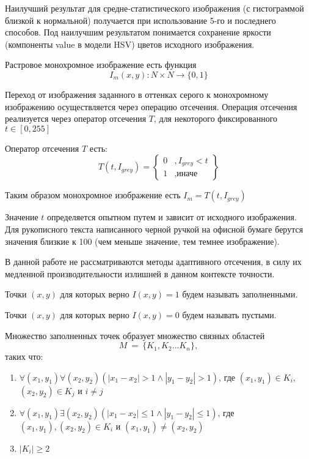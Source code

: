 \begin{remark}
Наилучший результат для средне-статистического изображения (с гистограммой близкой к нормальной) получается при использование 5-го и последнего способов. Под наилучшим результатом понимается сохранение яркости (компоненты value в модели HSV) цветов исходного изображения.
\end{remark}

\begin{definition}
Растровое монохромное изображение есть функция 
$$I_m(x,y): N \times N \to \{0,1\}$$
\end{definition}

Переход от изображения заданного в оттенках серого к монохромному изображению осуществляется через операцию отсечения. Операция отсечения реализуется через оператор отсечения $T$, для некоторого фиксированного $t\in[0,255]$
\begin{definition}
Оператор отсечения $T$ есть:
$$
T(t, I_{grey}) = \left\{ 
\begin{array}{ll}
0 & ,I_{grey} < t \\
1 & ,\text{иначе} 
\end{array}
\right\}
$$
\end{definition}
Таким образом монохромное изображение есть $I_m = T(t, I_{grey})$

\begin{remark}
Значение $t$ определяется опытном путем и зависит от исходного изображения. Для рукописного текста написанного черной ручкой на офисной бумаге берутся значения близкие к 100 (чем меньше значение, тем темнее изображение).
\end{remark}

\begin{remark}
В данной работе не рассматриваются методы адаптивного отсечения, в силу их медленной производительности излишней в данном контексте точности.
\end{remark}

\begin{definition}
Точки $(x,y)$ для которых верно $I(x,y) = 1$ будем называть заполненными.
\end{definition}

\begin{definition}
Точки $(x,y)$ для которых верно $I(x,y) = 0$ будем называть пустыми.
\end{definition}

Множество заполненных точек образует множество связных областей 
$$M~=~\{K_1, K_2 \dots K_n \},$$
таких что:
\begin{enumerate}
\item $\forall(x_1, y_1)\forall(x_2, y_2)(|x_1 - x_2| > 1 \wedge |y_1 - y_2|>1)$, где $(x_1, y_1)\in K_i$, $(x_2, y_2)\in K_j$ и $i\neq j$ 
\item $\forall(x_1, y_1)\exists(x_2, y_2)(|x_1 - x_2| \leq 1 \wedge |y_1 - y_2| \leq 1)$, где $(x_1, y_1),(x_2, y_2)\in K_i$ и $(x_1, y_1)\neq(x_2, y_2)$
\item $|K_i|\geq2$
\end{enumerate}

